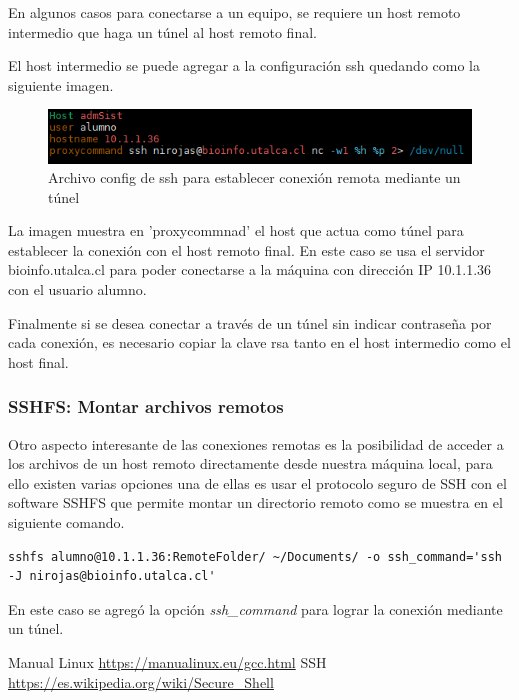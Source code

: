 \documentclass[12pt]{article}
\begin{document}
En algunos casos para conectarse a un equipo, se requiere un host remoto intermedio que haga un túnel al host remoto final.

El host intermedio se puede agregar a la configuración ssh quedando como la siguiente imagen. 

\begin{figure}[!h]
   \centering
   \includegraphics[scale=.82]{imgs/proxy_config.PNG}
   \caption{Archivo config de ssh para establecer conexión remota mediante un túnel}
   \label{fig6}
\end{figure}

La imagen muestra en 'proxycommnad' el host que actua como túnel para establecer la conexión con el host remoto final. En este caso se usa el servidor bioinfo.utalca.cl para poder conectarse a la máquina con dirección IP 10.1.1.36 con el usuario alumno.

Finalmente si se desea conectar a través de un túnel sin indicar contraseña por cada conexión, es necesario copiar la clave rsa tanto en el host intermedio como el host final.

\subsubsection{ SSHFS: Montar archivos remotos}

Otro aspecto interesante de las conexiones remotas es la posibilidad de acceder a los archivos de un host remoto directamente desde nuestra máquina local, para ello existen varias opciones una de ellas es usar el protocolo seguro de SSH con el software SSHFS que permite montar un directorio remoto como se muestra en el siguiente comando.

\begin{lstlisting}[frame=single]
sshfs alumno@10.1.1.36:RemoteFolder/ ~/Documents/ -o ssh_command='ssh -J nirojas@bioinfo.utalca.cl'
\end{lstlisting}

En este caso se agregó la opción \emph{ssh\_command} para lograr la conexión mediante un túnel.

\newpage
\begin{thebibliography}{99}
 Manual Linux \url{https://manualinux.eu/gcc.html}
 SSH \url{https://es.wikipedia.org/wiki/Secure_Shell}
\end{thebibliography}
\end{document}
